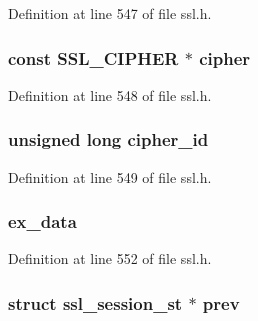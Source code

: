 Definition at line 547 of file ssl.\+h.

\subsubsection[{\texorpdfstring{cipher}{cipher}}]{\setlength{\rightskip}{0pt plus 5cm}const {\bf S\+S\+L\+\_\+\+C\+I\+P\+H\+ER} $\ast$ cipher}\hypertarget{structssl__session__st_ae2a2e0b20a47c976a7585890b67deafe}{}\label{structssl__session__st_ae2a2e0b20a47c976a7585890b67deafe}


Definition at line 548 of file ssl.\+h.

\subsubsection[{\texorpdfstring{cipher\+\_\+id}{cipher_id}}]{\setlength{\rightskip}{0pt plus 5cm}unsigned long cipher\+\_\+id}\hypertarget{structssl__session__st_a693bc4872abcf28b6ecd8d37fd64c671}{}\label{structssl__session__st_a693bc4872abcf28b6ecd8d37fd64c671}


Definition at line 549 of file ssl.\+h.

\subsubsection[{\texorpdfstring{ex\+\_\+data}{ex_data}}]{ ex\+\_\+data}\hypertarget{structssl__session__st_ac3e4fd59d6ee44a81f3a58114613c1e2}{}\label{structssl__session__st_ac3e4fd59d6ee44a81f3a58114613c1e2}


Definition at line 552 of file ssl.\+h.

\subsubsection[{\texorpdfstring{prev}{prev}}]{\setlength{\rightskip}{0pt plus 5cm}struct {\bf ssl\+\_\+session\+\_\+st} $\ast$ prev}\hypertarget{structssl__session__st_af80db8525d9076ef19deb073228b5423}{}\label{structssl__session__st_af80db8525d9076ef19deb073228b5423}


